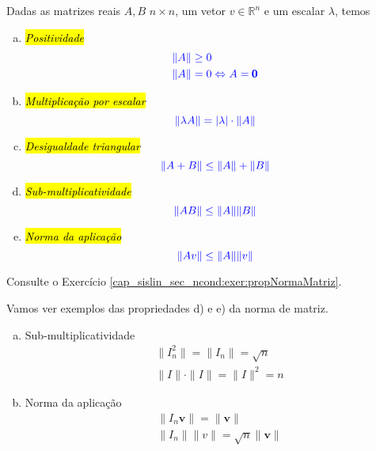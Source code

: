 \begin{prop}\label{cap_sislin_sec_ncond:prop:NormaMatriz}
  Dadas as matrizes reais $A, B$ $n\times n$, um vetor $v\in\mathbb{R}^n$ e um escalar $\lambda$, temos
  \begin{enumerate}[a)]
  \item \hl{\emph{Positividade}}
    \begin{align}
      &\color{blue}\|A\| \geq 0\\
      &\color{blue}\|A\| = 0 \Leftrightarrow A = \pmb{0}
    \end{align}
    
  \item \hl{\emph{Multiplicação por escalar}}
    \begin{equation}
      \color{blue}\|\lambda A\| = |\lambda|\cdot \|A\|
    \end{equation}
    
  \item \hl{\emph{Desigualdade triangular}}
    \begin{equation}
      \color{blue}\|A+B\| \leq \|A\| + \|B\|
    \end{equation}

  \item \hl{\emph{Sub-multiplicatividade}}
    \begin{equation}
      \color{blue}\|AB\| \leq \|A\|\|B\|
    \end{equation}
    
  \item \hl{\emph{Norma da aplicação}}
    \begin{equation}
      \color{blue}\|Av\| \leq \|A\|\|v\|
    \end{equation}
  \end{enumerate}
\end{prop}
\begin{dem}
  Consulte o Exercício \ref{cap_sislin_sec_ncond:exer:propNormaMatriz}.
\end{dem}

\begin{ex}
  Vamos ver exemplos das propriedades d) e e) da norma de matriz.
  \begin{enumerate}[a)]
  \item Sub-multiplicatividade
    \begin{align}
      &\|I_n^2\| = \|I_n\| = \sqrt{n}\\
      &\|I\|\cdot\|I\| = \|I\|^2 = n
    \end{align}
  \item Norma da aplicação
    \begin{align}
      &\|I_n\pmb{v}\| = \|\pmb{v}\|\\
      &\|I_n\|\|v\| = \sqrt{n}\|\pmb{v}\|
    \end{align}
  \end{enumerate}
\end{ex}

